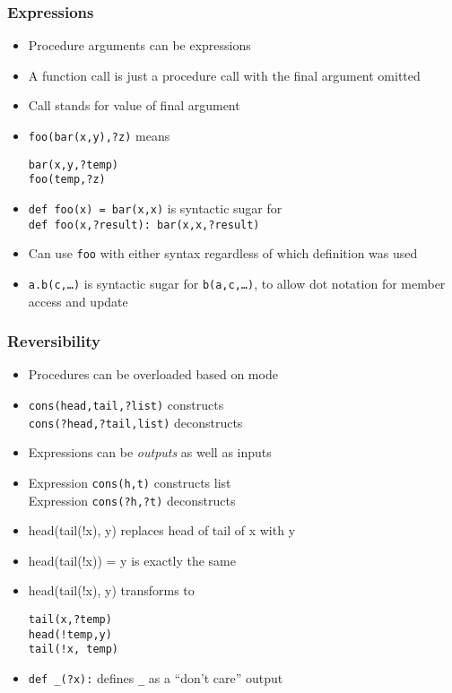 \documentclass[12pt]{beamer}
\begin{document}
\begin{frame}
\frametitle{Expressions}
\begin{itemize}
\item Procedure arguments can be expressions
\item A function call is just a procedure call with the final argument omitted
\item Call stands for value of final argument
\item \texttt{foo(bar(x,y),?z)} \quad means \quad
  \begin{minipage}[c]{0.4\linewidth}
  \texttt{bar(x,y,?temp)} \\
  \texttt{foo(temp,?z)}
  \end{minipage}
\item \texttt{def foo(x) = bar(x,x)} is syntactic sugar for \\
\texttt{def foo(x,?result): bar(x,x,?result)}
\item Can use \texttt{foo} with either syntax regardless of which
  definition was used
\item \texttt{a.b(c,\ldots)} is syntactic sugar for
  \texttt{b(a,c,\ldots)}, to allow dot notation for member access and update
\end{itemize}
\end{frame}


\begin{frame}
\frametitle{Reversibility}
\begin{itemize}
\item Procedures can be overloaded based on mode
\item \texttt{cons(head,tail,?list)}  constructs \\
\texttt{cons(?head,?tail,list)}  deconstructs \\
\item Expressions can be \emph{outputs} as well as inputs
\item Expression \texttt{cons(h,t)} constructs list \\
Expression \texttt{cons(?h,?t)} deconstructs
\item head(tail(!x), y) replaces head of tail of x with y
\item head(tail(!x)) = y is exactly the same
\item head(tail(!x), y) \quad transforms to \quad
  \begin{minipage}[c]{0.4\linewidth}
  \texttt{tail(x,?temp)} \\
  \texttt{head(!temp,y)} \\
  \texttt{tail(!x, temp)}
  \end{minipage}
\item \texttt{def \_(?x):} defines \texttt{\_} as a ``don't
  care'' output
\end{itemize}
\end{frame}
\end{document}
